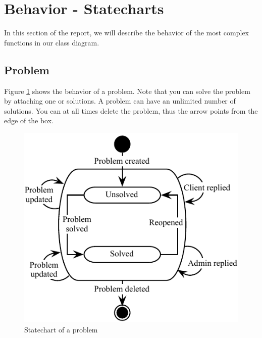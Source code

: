 \section{Behavior - Statecharts}
In this section of the report, we will describe the behavior of the most complex functions in our class diagram.

\subsection{Problem}
Figure \ref{fig:Klasse_diagram_problem} shows the behavior of a problem. Note that you can solve the problem by attaching one or solutions. A problem can have an unlimited number of solutions. You can at all times delete the problem, thus the arrow points from the edge of the box.
\begin{figure}[H]
\begin{center}
\includegraphics[width=1\textwidth]{input/problem_domain_analysis/klasse_diagram_problem.pdf}
\caption{Statechart of a problem}
\label{fig:Klasse_diagram_problem}
\end{center}
\end{figure}

